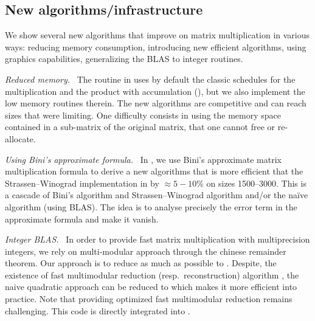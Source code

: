 \subsection{New algorithms/infrastructure}
%
We show several new algorithms that improve on matrix multiplication
in various ways: reducing memory consumption, introducing new efficient
algorithms, using graphics capabilities, generalizing the BLAS to integer
routines.
%
\def\monitem#1{\par \textit{#1}\ }
\monitem{Reduced memory.}
%
The routine \fgemm in \fflas uses by default the classic schedules for the multiplication
and the product with accumulation (\cf \cite{Boyer:2009:sched}), but we also
implement the low memory routines therein. The new algorithms are competitive
and can reach sizes that were limiting.
%
%
One difficulty consists in using the memory space contained in a sub-matrix of
the original matrix, that one cannot free or re-allocate.
%
\monitem{Using Bini's approximate formula.}
%
In \cite{BD:2014:Bini}, we use Bini's approximate matrix multiplication formula
to derive a new algorithms that is more efficient that the Strassen--Winograd
implementation in \fgemm by $\approx 5-10\%$ on sizes \num{1500}--\num{3000}.
This is a cascade of Bini's algorithm and Strassen--Winograd algorithm and/or
the naïve algorithm (using BLAS). The idea is to analyse precisely the error
term in the approximate formula and make it vanish.
%
\monitem{Integer BLAS.}
%
In order to provide fast matrix multiplication with multiprecision integers, we
rely on multi-modular approach through the chinese remainder theorem. Our
approach is to reduce as much as possible to \fgemm. Despite, the existence of
fast multimodular reduction (resp.\ reconstruction) algorithm
\cite{VonzurGathen:1999:MCA}, the naive quadratic approach can be reduced to
\fgemm which makes it more efficient into practice.  Note that providing
optimized fast multimodular reduction remains challenging. This code is
directly integrated  into \fflas.

